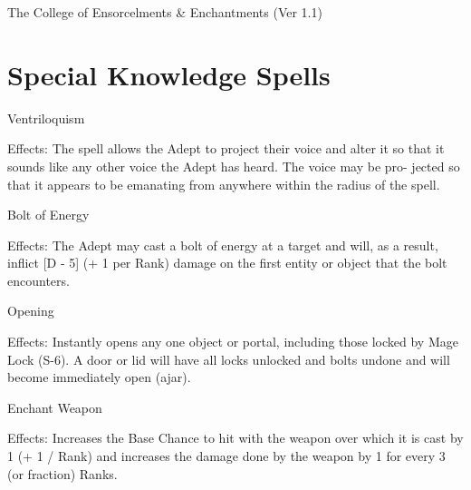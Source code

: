 \begin{Chapter}{The College of Ensorcelments \& Enchantments (Ver 1.1)}
\section{Special Knowledge Spells}


\begin{spell}[S-1]{Ventriloquism }

Effects: The spell allows the Adept to project their 
voice  and  alter  it  so  that  it  sounds  like  any  other 
voice the Adept has heard. The voice may be pro-
jected  so  that  it  appears  to  be  emanating  from 
anywhere within the radius of the spell. 

\end{spell}

\begin{spell}[S-2]{Bolt of Energy }

Effects:  The  Adept  may  cast  a  bolt  of  energy  at  a 
target  and  will,  as  a  result,  inflict  [D  -  5]  (+ 1 per 
Rank) damage on the first entity or object that the 
bolt encounters. 

\end{spell}

\begin{spell}[S-3]{Opening }

Effects:  Instantly  opens  any  one  object  or  portal, 
including  those  locked  by  Mage  Lock  (S-6).  A 
door  or  lid  will  have  all  locks  unlocked  and  bolts 
undone and will become immediately open (ajar). 

\end{spell}

\begin{spell}[S-4]{Enchant Weapon }

Effects:  Increases  the  Base  Chance  to  hit  with  the 
weapon over which it is cast by 1 (+ 1 / Rank) and 
increases the damage done by the weapon by 1 for 
every 3 (or fraction) Ranks. 


\end{spell}
\end{Chapter}

